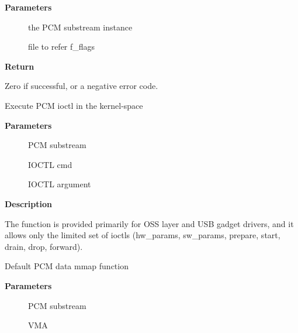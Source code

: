 \documentclass[a4paper,8pt,english]{sphinxmanual}
\begin{document}
\textbf{Parameters}
\begin{description}
\item[{}] \leavevmode
the PCM substream instance

\item[{}] \leavevmode
file to refer f\_flags

\end{description}

\textbf{Return}

Zero if successful, or a negative error code.

\begin{fulllineitems}
\label{sound/kernel-api/alsa-driver-api:c.snd_pcm_kernel_ioctl}
Execute PCM ioctl in the kernel-space

\end{fulllineitems}


\textbf{Parameters}
\begin{description}
\item[{}] \leavevmode
PCM substream

\item[{}] \leavevmode
IOCTL cmd

\item[{}] \leavevmode
IOCTL argument

\end{description}

\textbf{Description}

The function is provided primarily for OSS layer and USB gadget drivers,
and it allows only the limited set of ioctls (hw\_params, sw\_params,
prepare, start, drain, drop, forward).

\begin{fulllineitems}
\label{sound/kernel-api/alsa-driver-api:c.snd_pcm_lib_default_mmap}
Default PCM data mmap function

\end{fulllineitems}


\textbf{Parameters}
\begin{description}
\item[{}] \leavevmode
PCM substream

\item[{}] \leavevmode
VMA

\end{description}
\end{document}
